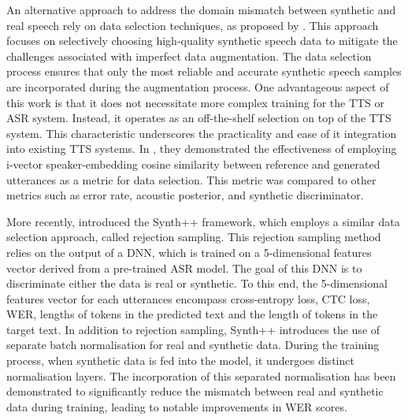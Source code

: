 An alternative approach to address the domain mismatch between synthetic and real speech rely on data selection techniques, as proposed by \cite{wang2021towards}.  This approach focuses on selectively choosing high-quality synthetic speech data to mitigate the challenges associated with imperfect data augmentation. The data selection process ensures that only the most reliable and accurate synthetic speech samples are incorporated during the augmentation process. One advantageous aspect of this work is that it does not necessitate more complex training for the TTS or ASR system. Instead, it operates as an off-the-shelf selection on top of the TTS system. This characteristic underscores the practicality and ease of it integration into existing TTS systems.
In \cite{wang2021towards}, they demonstrated the effectiveness of employing i-vector speaker-embedding cosine similarity between reference and generated utterances as a metric for data selection. This metric was compared to other metrics such as error rate, acoustic posterior, and synthetic discriminator. 

More recently, \cite{hu2022synt++} introduced the Synth++ framework, which employs a similar data selection approach, called rejection sampling. This rejection sampling method relies on the output of a DNN, which is trained on a 5-dimensional features vector derived from a pre-trained ASR model. The goal of this DNN is to discriminate either the data is real or synthetic. To this end, the 5-dimensional features vector for each utterances encompass cross-entropy loss, CTC loss, WER, lengths of tokens in the predicted text and the length of tokens in the target text. In addition to rejection sampling, Synth++ introduces the use of separate batch normalisation for real and synthetic data. During the training process, when synthetic data is fed into the model, it undergoes distinct normalisation layers. The incorporation of this separated normalisation has been demonstrated to significantly reduce the mismatch between real and synthetic data during training, leading to notable improvements in WER scores.

